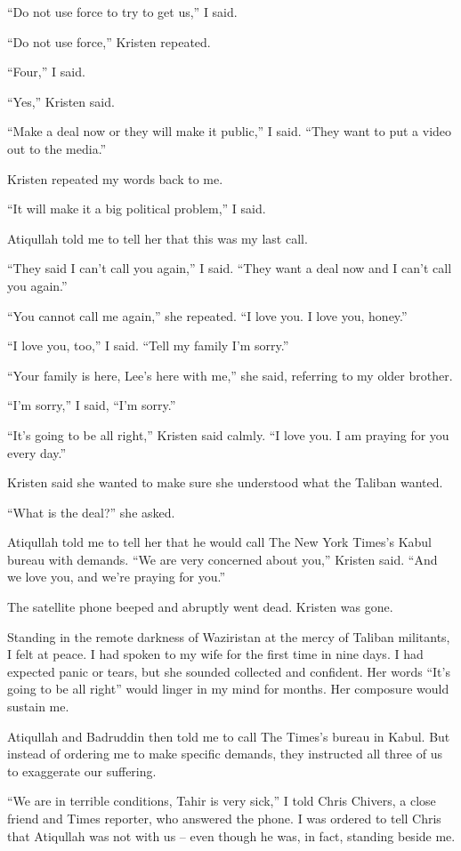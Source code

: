 ﻿\documentclass[12pt]{article}
\begin{document}
``Do not use force to try to get us,'' I said.

``Do not use force,'' Kristen repeated.

``Four,'' I said.

``Yes,'' Kristen said.

``Make a deal now or they will make it public,'' I said. ``They want to put a video out to the
media.''

Kristen repeated my words back to me.

``It will make it a big political problem,'' I said.

Atiqullah told me to tell her that this was my last call.

``They said I can't call you again,'' I said. ``They want a deal now and I can't call you again.''

``You cannot call me again,'' she repeated. ``I love you. I love you, honey.''

``I love you, too,'' I said. ``Tell my family I'm sorry.''

``Your family is here, Lee's here with me,'' she said, referring to my older brother.

``I'm sorry,'' I said, ``I'm sorry.''

``It's going to be all right,'' Kristen said calmly. ``I love you. I am praying for you every day.''

Kristen said she wanted to make sure she understood what the Taliban wanted.

``What is the deal?'' she asked.

Atiqullah told me to tell her that he would call The New York Times's Kabul bureau with demands.
``We are very concerned about you,'' Kristen said. ``And we love you, and we're praying for you.''

The satellite phone beeped and abruptly went dead. Kristen was gone.

Standing in the remote darkness of Waziristan at the mercy of Taliban militants, I felt at peace. I
had spoken to my wife for the first time in nine days. I had expected panic or tears, but she
sounded collected and confident. Her words ``It's going to be all right'' would linger in my mind
for months. Her composure would sustain me.

Atiqullah and Badruddin then told me to call The Times's bureau in Kabul. But instead of ordering me
to make specific demands, they instructed all three of us to exaggerate our suffering.

``We are in terrible conditions, Tahir is very sick,'' I told Chris Chivers, a close friend and
Times reporter, who answered the phone. I was ordered to tell Chris that Atiqullah was not with us
-- even though he was, in fact, standing beside me.
\end{document}
